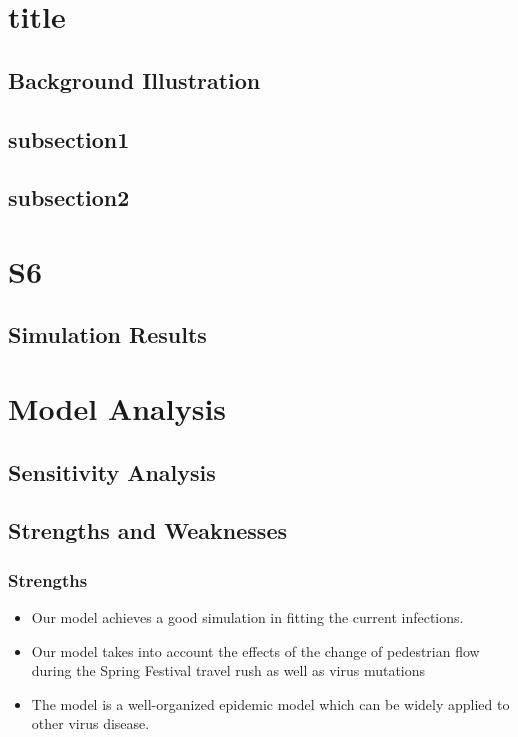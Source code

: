 \documentclass{mcmthesis}
\begin{document}
\section{title}\label{S5}

\subsection{Background Illustration}
   
    
\subsection{subsection1}\label{S5s1}
    

\subsection{subsection2}\label{S5s2}
	
 
\section{S6}\label{S6}
   
	
\subsection{Simulation Results}
    


\section{Model Analysis}\label{S7}

\subsection{Sensitivity Analysis}


\subsection{Strengths and Weaknesses}
\subsubsection{Strengths}
\begin{itemize}
	\item Our model achieves a good simulation in fitting the current infections.
	\item Our model takes into account the effects of the change of pedestrian flow during the Spring Festival travel rush as well as virus mutations
	\item The model is a well-organized epidemic model which can be widely applied to other virus disease.
\end{itemize}
\end{document}
